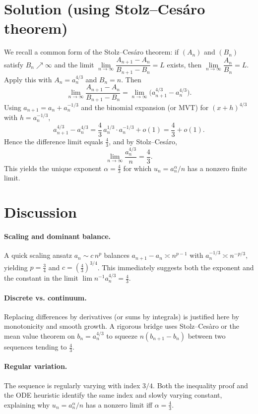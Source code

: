 \documentclass{article}
\begin{document}
\section{Solution (using Stolz--Ces\'aro theorem)}
We recall a common form of the Stolz--Ces\'aro theorem: if $(A_n)$ and $(B_n)$ satisfy $B_n\nearrow \infty$ and the limit $\lim\limits_{n\to\infty}\dfrac{A_{n+1}-A_n}{B_{n+1}-B_n}=L$ exists, then $\lim\limits_{n\to\infty}\dfrac{A_n}{B_n}=L$.
Apply this with $A_n=a_n^{4/3}$ and $B_n=n$. Then
$$\lim_{n\to\infty}\frac{A_{n+1}-A_n}{B_{n+1}-B_n}=\lim_{n\to\infty}\big(a_{n+1}^{4/3}-a_n^{4/3}\big).$$
Using $a_{n+1}=a_n+a_n^{-1/3}$ and the binomial expansion (or MVT) for $(x+h)^{4/3}$ with $h=a_n^{-1/3}$,
$$a_{n+1}^{4/3}-a_n^{4/3}=\frac{4}{3}\,a_n^{1/3}\cdot a_n^{-1/3}+o(1)=\frac{4}{3}+o(1).$$
Hence the difference limit equals $\tfrac{4}{3}$, and by Stolz--Ces\'aro,
$$\lim_{n\to\infty}\frac{a_n^{4/3}}{n}=\frac{4}{3}.$$
This yields the unique exponent $\alpha=\tfrac{4}{3}$ for which $u_n=a_n^\alpha/n$ has a nonzero finite limit.

\section{Discussion}

\paragraph{Scaling and dominant balance.}
A quick scaling ansatz $a_n \sim c\,n^p$ balances $a_{n+1}-a_n \asymp n^{p-1}$ with $a_n^{-1/3} \asymp n^{-p/3}$, yielding $p=\tfrac{3}{4}$ and $c=(\tfrac{4}{3})^{3/4}$. This immediately suggests both the exponent and the constant in the limit $\lim n^{-1}a_n^{4/3}=\tfrac{4}{3}$.

\paragraph{Discrete vs. continuum.}
Replacing differences by derivatives (or sums by integrals) is justified here by monotonicity and smooth growth. A rigorous bridge uses Stolz–Cesàro or the mean value theorem on $b_n=a_n^{4/3}$ to squeeze $n(b_{n+1}-b_n)$ between two sequences tending to $\tfrac{4}{3}$.

\paragraph{Regular variation.}
The sequence is regularly varying with index $3/4$. Both the inequality proof and the ODE heuristic identify the same index and slowly varying constant, explaining why $u_n=a_n^\alpha/n$ has a nonzero limit iff $\alpha=\tfrac{4}{3}$.
\end{document}
